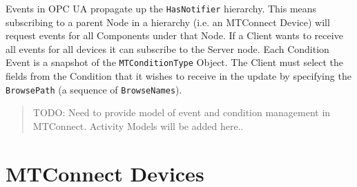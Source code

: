 \documentclass{mtconnect}	%
\begin{document}
Events in OPC UA propagate up the \texttt{HasNotifier} hierarchy. This means subscribing to a parent Node in a hierarchy (i.e. an MTConnect Device) will request events for all Components under that Node. If a Client wants to receive all events for all devices it can subscribe to the Server node.
Each Condition Event is a snapshot of the \texttt{MTConditionType} Object. The Client must select the fields from the Condition that it wishes to receive in the update by specifying the \texttt{BrowsePath} (a sequence of \texttt{BrowseNames}). 

\begin{quote}
    \color{red}
    TODO: Need to provide model of event and condition management in MTConnect. Activity Models will be added here..
\end{quote}

\clearpage

\section{MTConnect Devices}\label{mtconnect_devices}
\FloatBarrier


\end{document}
